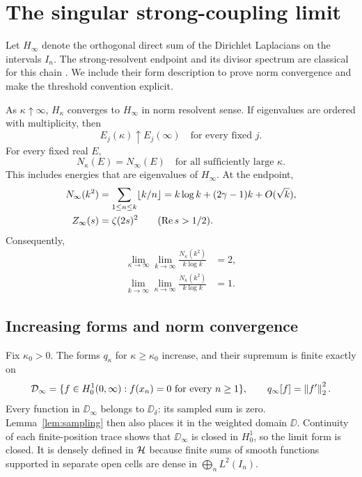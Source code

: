 \section{The singular strong-coupling limit}
\label{sec:limit}

Let $H_\infty$ denote the orthogonal direct sum of the
Dirichlet Laplacians on the intervals $I_n$.
The strong-resolvent endpoint and its divisor spectrum are
classical for this chain \citep{egger2011infinite}.
We include their form description to prove norm convergence
and make the threshold convention explicit.

\begin{theorem}
\label{thm:limit}
As $\kappa\uparrow\infty$, $H_\kappa$ converges to $H_\infty$
in norm resolvent sense. If eigenvalues are ordered with
multiplicity, then
\begin{equation}
E_j(\kappa)\uparrow E_j(\infty)
\quad\text{for every fixed }j.
\label{eq:eigen-limit}
\end{equation}
For every fixed real $E$,
\begin{equation}
N_\kappa(E)=N_\infty(E)
\quad\text{for all sufficiently large }\kappa.
\label{eq:inclusive-limit}
\end{equation}
This includes energies that are eigenvalues of $H_\infty$.
At the endpoint,
\begin{align}
N_\infty(k^2)
 &=\sum_{1\le n\le k}\lfloor k/n\rfloor
   =k\log k+(2\gamma-1)k+O(\sqrt k),\notag\\
Z_\infty(s)
 &=\zeta(2s)^2\qquad(\operatorname{Re} s>1/2).
\label{eq:endpoint-spectrum}
\end{align}
Consequently,
\begin{equation}
\begin{split}
\lim_{\kappa\to\infty}\lim_{k\to\infty}
\frac{N_\kappa(k^2)}{k\log k}&=2,\\
\lim_{k\to\infty}\lim_{\kappa\to\infty}
\frac{N_\kappa(k^2)}{k\log k}&=1.
\end{split}
\label{eq:iterated-limits}
\end{equation}
\end{theorem}

\subsection{Increasing forms and norm convergence}

Fix $\kappa_0>0$.
The forms $q_\kappa$ for $\kappa\ge\kappa_0$ increase,
and their supremum is finite exactly on
\begin{equation}
\mathcal{D}_\infty
=\{f\in H^1_0(0,\infty):f(x_n)=0\text{ for every }n\ge1\},
\qquad q_\infty[f]=\left\lVert f'\right\rVert_2^2.
\label{eq:limit-form}
\end{equation}
Every function in $\DD_\infty$ belongs to $\DD_\delta$:
its sampled sum is zero. Lemma~\ref{lem:sampling} then
also places it in the weighted domain $\DD$.
Continuity of each finite-position trace shows that
$\DD_\infty$ is closed in $H^1_0$, so the limit form is
closed.
It is densely defined in $\mathcal{H}$ because finite sums of
smooth functions supported in separate open cells are
dense in $\bigoplus_nL^2(I_n)$.

